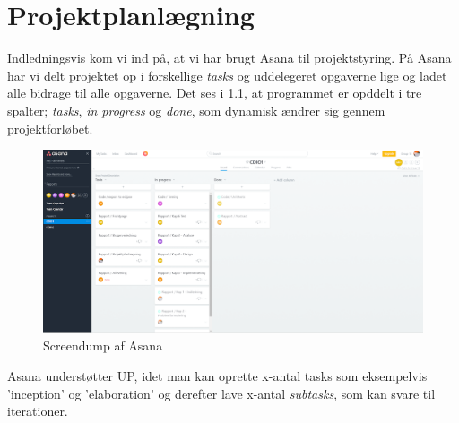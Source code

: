 \chapter{Projektplanlægning}

Indledningsvis kom vi ind på, at vi har brugt Asana til projektstyring.
På Asana har vi delt projektet op i forskellige \textit{tasks} og uddelegeret opgaverne lige og ladet alle bidrage til alle opgaverne.
Det ses i \ref{fig:Asana}, at programmet er opddelt i tre spalter; \textit{tasks}, \textit{in progress} og \textit{done}, som dynamisk ændrer sig gennem projektforløbet.

\begin{figure}[h]
    \begin{center}
        \includegraphics[width=15cm]{graphics/Asana}
        \caption{Screendump af Asana}
        \label{fig:Asana}
    \end{center}
\end{figure}

\noindent
Asana understøtter UP, idet man kan oprette x-antal tasks som eksempelvis 'inception' og 'elaboration' og derefter lave x-antal \textit{subtasks}, som kan svare til iterationer.

\pagebreak

